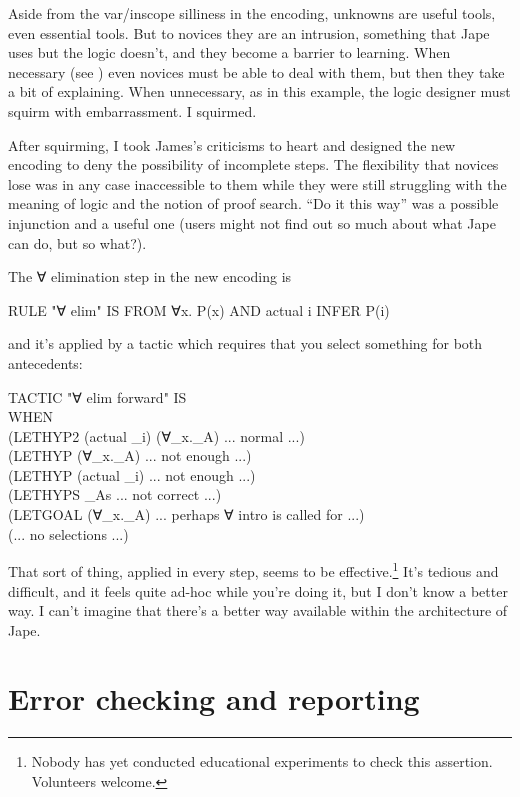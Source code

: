 Aside from the var/inscope silliness in the  encoding, unknowns are useful tools, even essential tools. But to novices they are an intrusion, something that Jape uses but the logic doesn't, and they become a barrier to learning. When necessary (see ) even novices must be able to deal with them, but then they take a bit of explaining. When unnecessary, as in this example, the logic designer must squirm with embarrassment. I squirmed.

After squirming, I took James's criticisms to heart and designed the new encoding to deny the possibility of incomplete steps. The flexibility that novices lose was in any case inaccessible to them while they were still struggling with the meaning of logic and the notion of proof search. ``Do it this way'' was a possible injunction and a useful one (users might not find out so much about what Jape can do, but so what?). 

The ∀ elimination step in the new encoding is
\begin{japeish}
RULE "∀ elim" IS FROM ∀x. P(x) AND actual i INFER P(i)
\end{japeish}
and it's applied by a tactic which requires that you select something for both antecedents:
\begin{japeish}
TACTIC "∀ elim forward" IS \\
\tab WHEN     \\
\tab \tab (LETHYP2 (actual \_i) (∀\_x.\_A) ... normal ...) \\
\tab \tab (LETHYP (∀\_x.\_A) ... not enough ...) \\
\tab \tab (LETHYP (actual \_i) ... not enough ...) \\
\tab \tab (LETHYPS \_As ... not correct ...) \\
\tab \tab (LETGOAL (∀\_x.\_A) ... perhaps ∀ intro is called for ...) \\
\tab \tab (... no selections ...)
\end{japeish}

That sort of thing, applied in every step, seems to be effective.\footnote{Nobody has yet conducted educational experiments to check this assertion. Volunteers welcome.} It's tedious and difficult, and it feels quite ad-hoc while you're doing it, but I don't know a better way. I can't imagine that there's a better way available within the architecture of Jape.

\section{Error checking and reporting}
\label{sec:I2L:errors}

